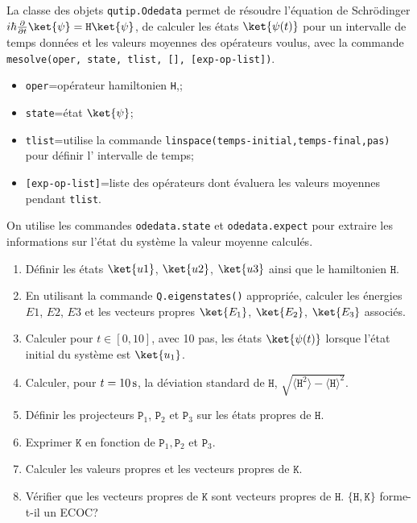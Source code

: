La classe des objets \texttt{qutip.Odedata} permet de résoudre l'équation de 
Schr\"odinger $i\hbar\frac{\partial}{\partial t}\ket{\psi}=\mathtt{H} 
\ket{\psi}$, de calculer les états $\ket{\psi(t)}$ pour un intervalle de temps 
données et les valeurs moyennes des opérateurs voulus, avec la commande 
\texttt{mesolve(oper, state, tlist, [], [exp-op-list])}.
\begin{itemize}
 \item \texttt{oper}=opérateur hamiltonien \texttt{H},;
 \item \texttt{state}=état $\ket{\psi}$;
  \item \texttt{tlist}=utilise la commande
\texttt{linspace(temps-initial,temps-final,pas)} pour définir l' intervalle de
temps;
\item \texttt{[exp-op-list]}=liste des opérateurs dont évaluera les valeurs
moyennes pendant \texttt{tlist}.
\end{itemize}
On utilise les commandes \texttt{odedata.state} et \texttt{odedata.expect} pour
extraire les informations sur l'état du système la valeur moyenne calculés.

\begin{enumerate}
\item Définir les états $\ket{u1}$, $\ket{u2}$, $\ket{u3}$ ainsi que le
hamiltonien $\mathtt{H}$.

\item En utilisant la commande \texttt{Q.eigenstates()} appropriée, calculer
les énergies $E1$, $E2$, $E3$ et les vecteurs propres $\ket{E_1}$, $\ket{E_2}$,
$\ket{E_3}$ associés.

\item Calculer pour $t\in[0,10]$, avec 10 pas, les états $\ket{\psi(t)}$
lorsque l'état initial du système est $\ket{u_1}$.

\item Calculer, pour $t=10\operatorname{s}$, la déviation standard de $\mathtt{H}$,
$\sqrt{\langle\mathtt{H}^2\rangle-\langle\mathtt{H}\rangle^2}$.

\item Définir les projecteurs $\mathtt{P}_1$, $\mathtt{P}_2$ et $\mathtt{P}_3$ 
sur les états propres de
$\mathtt{H}$.

\item Exprimer $\mathtt{K}$ en fonction de $\mathtt{P}_1,\mathtt{P}_2$ et 
$\mathtt{P}_3$.

\item Calculer les valeurs propres et les vecteurs propres de $\mathtt{K}$.

\item Vérifier que les vecteurs propres de $\mathtt{K}$ sont vecteurs propres
de $\mathtt{H}$. $\{\mathtt{H},\mathtt{K}\}$ forme-t-il un ECOC?
\end{enumerate}


